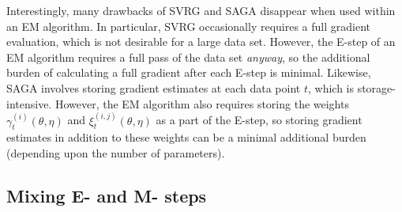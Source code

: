 

Interestingly, many drawbacks of SVRG and SAGA disappear when used within an EM algorithm. In particular, SVRG occasionally requires a full gradient evaluation, which is not desirable for a large data set. However, the E-step of an EM algorithm requires a full pass of the data set \textit{anyway}, so the additional burden of calculating a full gradient after each E-step is minimal. Likewise, SAGA involves storing gradient estimates at each data point $t$, which is storage-intensive. However, the EM algorithm also requires storing the weights $\gamma_t^{(i)}(\theta, \eta)$ and $\xi_t^{(i,j)}(\theta, \eta)$ as a part of the E-step, so storing gradient estimates in addition to these weights can be a minimal additional burden (depending upon the number of parameters).



\subsection{Mixing E- and M- steps}

